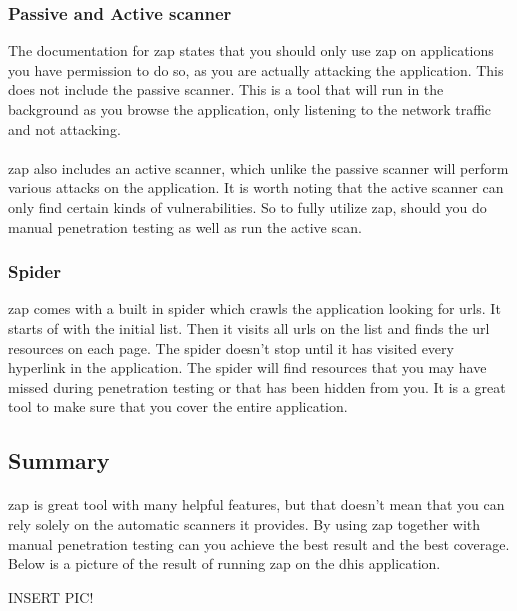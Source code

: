 \documentclass[11pt,english,a4paper]{report}
\begin{document}
\subsubsection{Passive and Active scanner}
The documentation for \gls{zap} states that you should only use \gls{zap} on applications you have permission to do so, as you are actually attacking the application. 
This does not include the passive scanner. 
This is a tool that will run in the background as you browse the application, only listening to the network traffic and not attacking. 

\paragraph{}
\gls{zap} also includes an active scanner, which unlike the passive scanner will perform various attacks on the application. 
It is worth noting that the active scanner can only find certain kinds of vulnerabilities. 
So to fully utilize zap, should you do manual penetration testing as well as run the active scan.

\subsubsection{Spider}
\gls{zap} comes with a built in spider which crawls the application looking for \glspl{url}.
It starts of with the initial list. 
Then it visits all \glspl{url} on the list and finds the \gls{url} resources on each page. 
The spider doesn't stop until it has visited every hyperlink in the application.
The spider will find resources that you may have missed during penetration testing or that has been hidden from you. 
It is a great tool to make sure that you cover the entire application.

\subsection{Summary}
\paragraph{}
\gls{zap} is great tool with many helpful features, but that doesn't mean that you can rely solely on the automatic scanners it provides. 
By using \gls{zap} together with manual penetration testing can you achieve the best result and the best coverage. 
Below is a picture of the result of running \gls{zap} on the \gls{dhis} application.

INSERT PIC!
\end{document}
